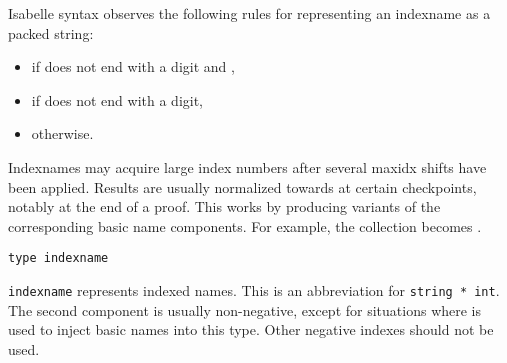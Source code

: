 \begin{isabellebody}
\begin{isamarkuptext}
  \medskip Isabelle syntax observes the following rules for
  representing an indexname  as a packed string:

  \begin{itemize}

  \item {} if  does not end with a digit and ,

  \item {} if  does not end with a digit,

  \item {} otherwise.

  \end{itemize}

  Indexnames may acquire large index numbers after several maxidx
  shifts have been applied.  Results are usually normalized towards
   at certain checkpoints, notably at the end of a proof.
  This works by producing variants of the corresponding basic name
  components.  For example, the collection 
  becomes .%
\end{isamarkuptext}%
\isamarkuptrue%
%
\isadelimmlref
%
\endisadelimmlref
%
\isatagmlref
%
\begin{isamarkuptext}%
\begin{mldecls}
  \verb|type indexname| \\
  \end{mldecls}

  \begin{description}

  \item \verb|indexname| represents indexed names.  This is an
  abbreviation for \verb|string * int|.  The second component is
  usually non-negative, except for situations where 
  is used to inject basic names into this type.  Other negative
  indexes should not be used.


\end{description}
\end{isamarkuptext}
\end{isabellebody}
